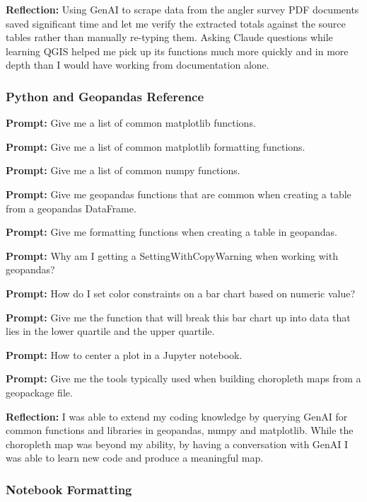 \documentclass[11pt]{article}
\begin{document}
\textbf{Reflection:} Using GenAI to scrape data from the angler survey
PDF documents saved significant time and let me verify the extracted
totals against the source tables rather than manually re-typing them.
Asking Claude questions while learning QGIS helped me pick up its
functions much more quickly and in more depth than I would have working
from documentation alone.

\hypertarget{python-and-geopandas-reference}{%
\subsubsection{Python and Geopandas
Reference}\label{python-and-geopandas-reference}}

\textbf{Prompt:} Give me a list of common matplotlib functions.

\textbf{Prompt:} Give me a list of common matplotlib formatting
functions.

\textbf{Prompt:} Give me a list of common numpy functions.

\textbf{Prompt:} Give me geopandas functions that are common when
creating a table from a geopandas DataFrame.

\textbf{Prompt:} Give me formatting functions when creating a table in
geopandas.

\textbf{Prompt:} Why am I getting a SettingWithCopyWarning when working
with geopandas?

\textbf{Prompt:} How do I set color constraints on a bar chart based on
numeric value?

\textbf{Prompt:} Give me the function that will break this bar chart up
into data that lies in the lower quartile and the upper quartile.

\textbf{Prompt:} How to center a plot in a Jupyter notebook.

\textbf{Prompt:} Give me the tools typically used when building
choropleth maps from a geopackage file.

\textbf{Reflection:} I was able to extend my coding knowledge by
querying GenAI for common functions and libraries in geopandas, numpy
and matplotlib. While the choropleth map was beyond my ability, by
having a conversation with GenAI I was able to learn new code and
produce a meaningful map.

\hypertarget{notebook-formatting}{%
\subsubsection{Notebook Formatting}\label{notebook-formatting}}
\end{document}
